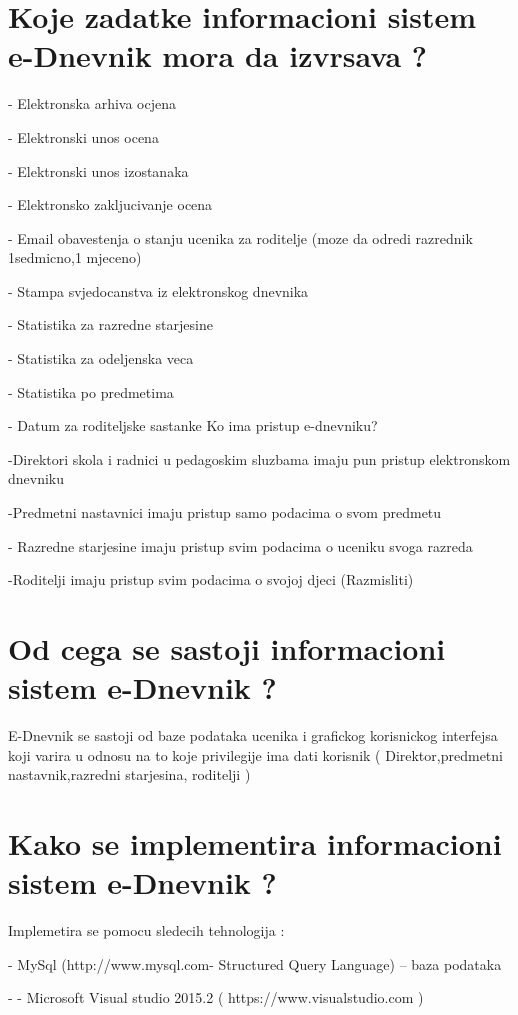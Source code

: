 \documentclass[14pt,a4paper]{book}
\begin{document}
\section*{Koje zadatke informacioni sistem e-Dnevnik mora da izvrsava ?} 
\enumerate
\item -	Elektronska arhiva ocjena
\item -	Elektronski unos ocena 
\item -	Elektronski unos izostanaka
\item -	Elektronsko zakljucivanje ocena
\item -	Email obavestenja o stanju ucenika za roditelje (moze da odredi razrednik 1sedmicno,1 mjeceno) 
\item -	Stampa svjedocanstva iz elektronskog dnevnika
\item -	Statistika za razredne starjesine
\item -	Statistika za odeljenska veca 
\item -	Statistika  po predmetima
\item -	Datum za roditeljske sastanke 
 \newpage
Ko ima pristup e-dnevniku?
 \enumerate
\item -Direktori skola i radnici u pedagoskim sluzbama imaju pun pristup elektronskom dnevniku
\item -Predmetni nastavnici imaju pristup samo podacima o svom predmetu
\item - Razredne starjesine imaju pristup svim podacima o uceniku svoga razreda
\item -Roditelji imaju pristup svim podacima o svojoj djeci (Razmisliti) 

\section*{Od cega se sastoji informacioni sistem e-Dnevnik ?}
E-Dnevnik se sastoji  od baze podataka ucenika i grafickog korisnickog interfejsa koji varira u odnosu na to koje privilegije ima dati korisnik ( Direktor,predmetni nastavnik,razredni starjesina, roditelji )

\section*{Kako se implementira informacioni sistem e-Dnevnik  ?}
Implemetira se pomocu sledecih tehnologija :
\newline
\enumerate
\item[-]  MySql (http://www.mysql.com- Structured Query Language) – baza podataka 
\item[-] -	Microsoft Visual studio 2015.2  ( https://www.visualstudio.com )
\end{document}
